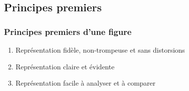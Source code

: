 \documentclass[aspectratio=169]{beamer}
\begin{document}
    









\subsection{Principes premiers}
\label{sub:principes_premiers}



\begin{frame}[c]\frametitle{Principes premiers d'une figure}

\begin{enumerate}\setlength\itemsep{2em}
	\item Représentation fidèle, non-trompeuse et sans distorsions

	\item Représentation claire et évidente

	\item Représentation facile à analyser et à comparer
\end{enumerate}

\end{frame}
\end{document}
